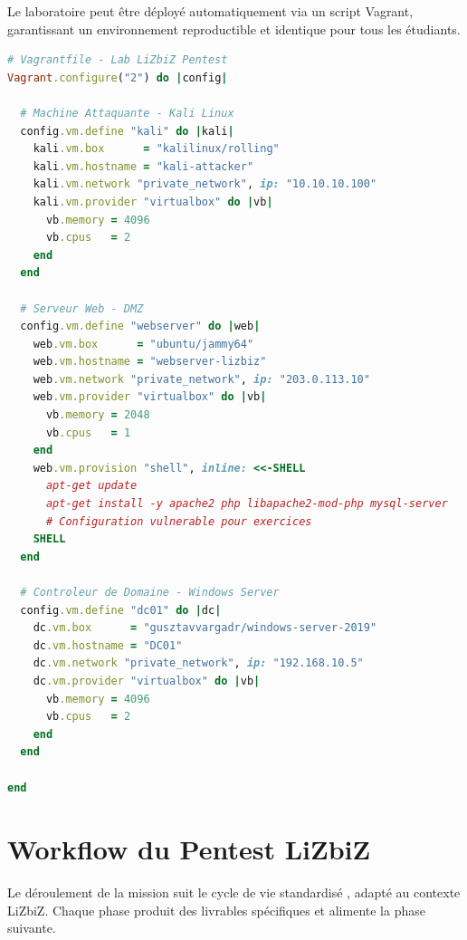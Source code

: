 Le laboratoire peut être déployé automatiquement via un script Vagrant, garantissant
un environnement reproductible et identique pour tous les étudiants.

\begin{lstlisting}[language=Ruby, caption={Vagrantfile, Lab LiZbiZ Pentest},
                   label={lst:vagrantfile}]
# Vagrantfile - Lab LiZbiZ Pentest
Vagrant.configure("2") do |config|

  # Machine Attaquante - Kali Linux
  config.vm.define "kali" do |kali|
    kali.vm.box      = "kalilinux/rolling"
    kali.vm.hostname = "kali-attacker"
    kali.vm.network "private_network", ip: "10.10.10.100"
    kali.vm.provider "virtualbox" do |vb|
      vb.memory = 4096
      vb.cpus   = 2
    end
  end

  # Serveur Web - DMZ
  config.vm.define "webserver" do |web|
    web.vm.box      = "ubuntu/jammy64"
    web.vm.hostname = "webserver-lizbiz"
    web.vm.network "private_network", ip: "203.0.113.10"
    web.vm.provider "virtualbox" do |vb|
      vb.memory = 2048
      vb.cpus   = 1
    end
    web.vm.provision "shell", inline: <<-SHELL
      apt-get update
      apt-get install -y apache2 php libapache2-mod-php mysql-server
      # Configuration vulnerable pour exercices
    SHELL
  end

  # Controleur de Domaine - Windows Server
  config.vm.define "dc01" do |dc|
    dc.vm.box      = "gusztavvargadr/windows-server-2019"
    dc.vm.hostname = "DC01"
    dc.vm.network "private_network", ip: "192.168.10.5"
    dc.vm.provider "virtualbox" do |vb|
      vb.memory = 4096
      vb.cpus   = 2
    end
  end

end
\end{lstlisting}

\section{Workflow du Pentest LiZbiZ}
\label{sec:workflow}

Le déroulement de la mission suit le cycle de vie standardisé ,
adapté au contexte LiZbiZ. Chaque phase produit des livrables spécifiques et
alimente la phase suivante.

